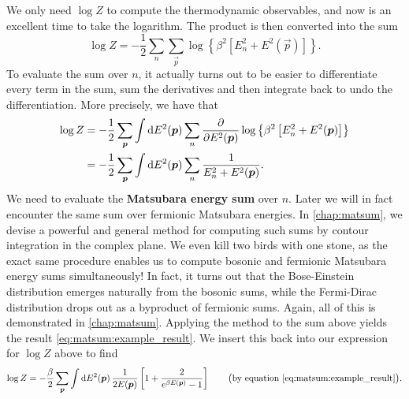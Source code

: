\fi
We only need $\log Z$ to compute the thermodynamic observables, and now is an excellent time to take the logarithm.
The product is then converted into the sum
\begin{equation}
	\log Z = -\frac12 \sum_n \sum_\vec{p} 
	         \log \left\{ \beta^2 \left[ E_n^2 + E^2(\vec{p}) \right] \right\} .
\label{eq:tft:boson_log_sum}
\end{equation}
To evaluate the sum over $n$, it actually turns out to be easier to differentiate every term in the sum, sum the derivatives and then integrate back to undo the differentiation.
More precisely, we have that
\begin{equation}
\begin{split}
	\log Z %
	       &= -\frac12 \sum_\vec{p} \int \dif E^2(\vec{p}) \sum_n \pdv*{\log \left\{ \beta^2 \left[ E_n^2 + E^2(\vec{p}) \right] \right\}}{E^2(\vec{p})} \\
	       &= -\frac12 \sum_\vec{p} \int \dif E^2(\vec{p}) \sum_n \frac{1}{E_n^2 + E^2(\vec{p})} . \\
\end{split}
\label{eq:tft:matsubara_sum_bosons}
\end{equation}
We need to evaluate the \textbf{Matsubara energy sum} over $n$. 
Later we will in fact encounter the same sum over fermionic Matsubara energies.
In \cref{chap:matsum}, we devise a powerful and general method for computing such sums by contour integration in the complex plane.
We even kill two birds with one stone, as the exact same procedure enables us to compute bosonic and fermionic Matsubara energy sums simultaneously!
In fact, it turns out that the Bose-Einstein distribution emerges naturally from the bosonic sums, while the Fermi-Dirac distribution drops out as a byproduct of fermionic sums.
Again, all of this is demonstrated in \cref{chap:matsum}.
Applying the method to the sum above yields the result \eqref{eq:matsum:example_result}.
We insert this back into our expression for $\log Z$ above to find
\begin{equation}
	\log Z = -\frac{\beta}{2} \sum_{\bm{p}} \int \mathop{}\!\mathrm{d} E^2({\bm{p}}) \, \frac{1}{2 E({\bm{p}})} \left[ 1 + \frac{2}{e^{\beta E({\bm{p}})} - 1} \right] \qquad \big( \text{by equation \eqref{eq:matsum:example_result}} \big) .
\end{equation}
